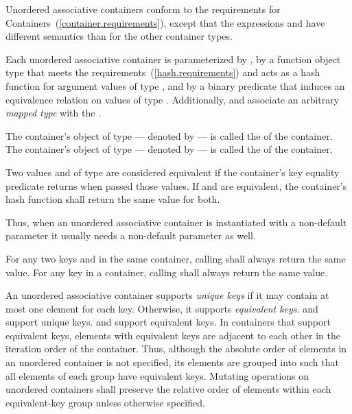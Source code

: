 \pnum
{}%
%
%
Unordered associative containers conform to the requirements for
Containers~(\ref{container.requirements}), except that
the expressions
 and  have different semantics than for the other
container types.

\pnum
Each unordered associative container is parameterized by ,
by a function object type  that meets the 
requirements~(\ref{hash.requirements}) and acts as a hash function for
argument values of type , and by a binary predicate 
that induces an equivalence relation on values of type .
Additionally,  and  associate
an arbitrary \textit{mapped type}  with the .

\pnum
{}%
%
The container's object of type  --- denoted by
 --- is called the  of the
container. The container's object of type  ---
denoted by  --- is called the
 of the container.

\pnum
{}%
Two values  and  of type  are
considered equivalent if the container's
key equality predicate returns
 when passed those values.  If  and
 are equivalent, the container's hash function shall
return the same value for both.
\begin{note} Thus, when an unordered associative container is instantiated with
a non-default  parameter it usually needs a non-default 
parameter as well. \end{note}
For any two keys  and  in the same container,
calling  shall always return the same value.
For any key  in a container, calling 
shall always return the same value.

\pnum
{}%
%
An unordered associative container supports \textit{unique keys} if it
may contain at most one element for each key.  Otherwise, it supports
\textit{equivalent keys}.   and 
support unique keys.  and 
support equivalent keys.  In containers that support equivalent keys,
elements with equivalent keys are adjacent to each other
in the iteration order of the container. Thus, although the absolute order
of elements in an unordered container is not specified, its elements are
grouped into  such that all elements of each
group have equivalent keys. Mutating operations on unordered containers shall
preserve the relative order of elements within each equivalent-key group
unless otherwise specified.

